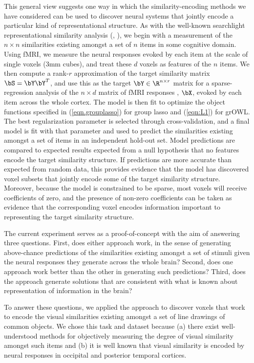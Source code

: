 This general view suggests one way in which the similarity-encoding methods we have considered can be used to discover neural systems that jointly encode a particular kind of representational structure. As with the well-known searchlight representational similarity analysis (\cite{RSA}, \cite{similarity}), we begin with a measurement of the $n \times n $ similarities existing amongst a set of $n$ items in some cognitive domain.  Using fMRI, we measure the neural responses evoked by each item at the scale of single voxels (3mm cubes), and treat these $d$ voxels as features of the $n$ items. We then compute a rank-$r$ approximation of the target similarity matrix $\bS = \bY \bY^T$, and use this as the target $\bY \in \R^{n \times r} $ matrix for a sparse-regression analysis of the $n \times d$ matrix of fMRI responses , $\bX$,  evoked by each item across the whole cortex. The model is then fit to optimize the object functions specified in (\ref{eqn.grouplasso}) for group lasso and (\ref{eqn:L1}) for grOWL. The best regularization parameter is selected through cross-validation, and a final model is fit with that parameter and used to predict the similarities existing amongst a set of items in an independent hold-out set. Model predictions are compared to expected results expected from a null hypothesis that no features encode the target similarity structure. If predictions are more accurate than expected from random data, this provides evidence that the model has discovered voxel subsets that jointly encode some of the target similarity structure. Moreover, because the model is constrained to be sparse, most voxels will receive coefficients of zero, and the presence of non-zero coefficients can be taken as evidence that the corresponding voxel encodes information important to representing the target similarity structure.

The current experiment serves as a proof-of-concept with the aim of answering three questions. First, does either approach work, in the sense of generating above-chance predictions of the similarities existing amongst a set of stimuli given the neural responses they generate across the whole brain? Second, does one approach work better than the other in generating such predictions? Third, does the approach generate solutions that are consistent with what is known about representation of information in the brain?

To answer these questions, we applied the approach to discover voxels that work to encode the visual similarities existing amongst a set of line drawings of common objects. We chose this task and dataset because (a) there exist well-understood methods for objectively measuring the degree of visual similarity amongst such items \cite{antani02} and (b) it is well known that visual similarity is encoded by neural responses in occipital and posterior temporal cortices.

